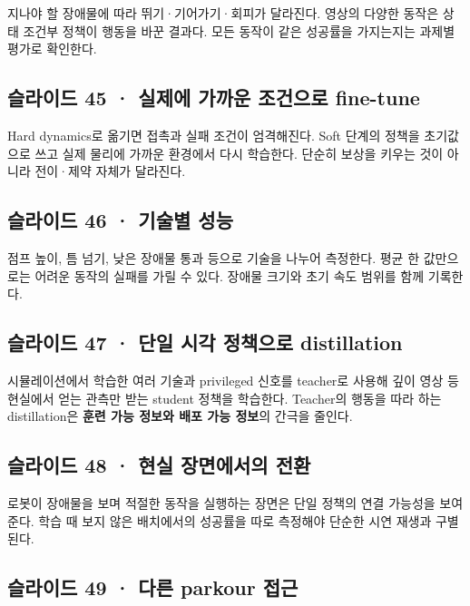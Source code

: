 \documentclass[11pt,a4paper]{article}
\begin{document}
지나야 할 장애물에 따라 뛰기·기어가기·회피가 달라진다. 영상의 다양한 동작은 상태 조건부 정책이 행동을 바꾼 결과다. 모든 동작이 같은 성공률을 가지는지는 과제별 평가로 확인한다.\par

\subsection{슬라이드 45 · 실제에 가까운 조건으로 fine-tune}

Hard dynamics로 옮기면 접촉과 실패 조건이 엄격해진다. Soft 단계의 정책을 초기값으로 쓰고 실제 물리에 가까운 환경에서 다시 학습한다. 단순히 보상을 키우는 것이 아니라 전이·제약 자체가 달라진다.\par

\subsection{슬라이드 46 · 기술별 성능}

점프 높이, 틈 넘기, 낮은 장애물 통과 등으로 기술을 나누어 측정한다. 평균 한 값만으로는 어려운 동작의 실패를 가릴 수 있다. 장애물 크기와 초기 속도 범위를 함께 기록한다.\par

\subsection{슬라이드 47 · 단일 시각 정책으로 distillation}

시뮬레이션에서 학습한 여러 기술과 privileged 신호를 teacher로 사용해 깊이 영상 등 현실에서 얻는 관측만 받는 student 정책을 학습한다. Teacher의 행동을 따라 하는 distillation은 \textbf{훈련 가능 정보와 배포 가능 정보}의 간극을 줄인다.\par

\subsection{슬라이드 48 · 현실 장면에서의 전환}

로봇이 장애물을 보며 적절한 동작을 실행하는 장면은 단일 정책의 연결 가능성을 보여 준다. 학습 때 보지 않은 배치에서의 성공률을 따로 측정해야 단순한 시연 재생과 구별된다.\par

\subsection{슬라이드 49 · 다른 parkour 접근}
\end{document}
